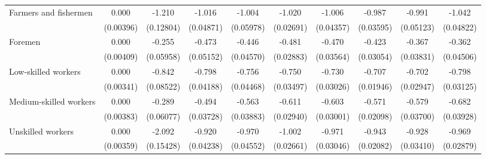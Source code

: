 {\begin{tabular}{l*{9}{c}}
Farmers and fishermen&       0.000         &      -1.210\sym{***}&      -1.016\sym{***}&      -1.004\sym{***}&      -1.020\sym{***}&      -1.006\sym{***}&      -0.987\sym{***}&      -0.991\sym{***}&      -1.042\sym{***}\\
                    &   (0.00396)         &   (0.12804)         &   (0.04871)         &   (0.05978)         &   (0.02691)         &   (0.04357)         &   (0.03595)         &   (0.05123)         &   (0.04822)         \\
Foremen             &       0.000         &      -0.255\sym{***}&      -0.473\sym{***}&      -0.446\sym{***}&      -0.481\sym{***}&      -0.470\sym{***}&      -0.423\sym{***}&      -0.367\sym{***}&      -0.362\sym{***}\\
                    &   (0.00409)         &   (0.05958)         &   (0.05152)         &   (0.04570)         &   (0.02883)         &   (0.03564)         &   (0.03054)         &   (0.03831)         &   (0.04506)         \\
Low-skilled workers &       0.000         &      -0.842\sym{***}&      -0.798\sym{***}&      -0.756\sym{***}&      -0.750\sym{***}&      -0.730\sym{***}&      -0.707\sym{***}&      -0.702\sym{***}&      -0.798\sym{***}\\
                    &   (0.00341)         &   (0.08522)         &   (0.04188)         &   (0.04468)         &   (0.03497)         &   (0.03026)         &   (0.01946)         &   (0.02947)         &   (0.03125)         \\
Medium-skilled workers&       0.000         &      -0.289\sym{***}&      -0.494\sym{***}&      -0.563\sym{***}&      -0.611\sym{***}&      -0.603\sym{***}&      -0.571\sym{***}&      -0.579\sym{***}&      -0.682\sym{***}\\
                    &   (0.00383)         &   (0.06077)         &   (0.03728)         &   (0.03883)         &   (0.02940)         &   (0.03001)         &   (0.02098)         &   (0.03700)         &   (0.03928)         \\
Unskilled workers   &       0.000         &      -2.092\sym{***}&      -0.920\sym{***}&      -0.970\sym{***}&      -1.002\sym{***}&      -0.971\sym{***}&      -0.943\sym{***}&      -0.928\sym{***}&      -0.969\sym{***}\\
                    &   (0.00359)         &   (0.15428)         &   (0.04238)         &   (0.04552)         &   (0.02661)         &   (0.03046)         &   (0.02082)         &   (0.03410)         &   (0.02879)         \\

\end{tabular}}

